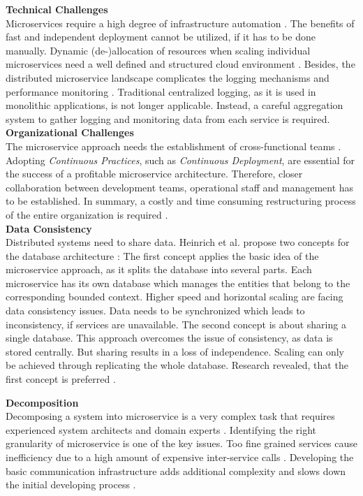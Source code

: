 \noindent
\textbf{Technical Challenges}\\
Microservices require a high degree of infrastructure automation \cite{MigratingTowardsSurvey}. The benefits of fast and independent deployment cannot be utilized, if it has to be done manually. Dynamic (de-)allocation of resources when scaling individual microservices need a well defined and structured cloud environment \cite{MigratingCloud}. 
Besides, the distributed microservice landscape complicates the logging mechanisms and performance monitoring \cite{SystematicMappingStudyMicroservice}. Traditional centralized logging, as it is used in monolithic applications, is not longer applicable. Instead, a careful aggregation system to gather logging and monitoring data from each service is required.\\

\noindent
\textbf{Organizational Challenges}\\
The microservice approach needs the establishment of cross-functional teams \cite{Fowler}. Adopting \textit{Continuous Practices}, such as \textit{Continuous Deployment}, are essential for the success of a profitable microservice architecture. Therefore, closer collaboration between development teams, operational staff and management has to be established. In summary, a costly and time consuming restructuring process of the entire organization is required \cite{NikoProseminar}. \\


\noindent
\textbf{Data Consistency}\\
Distributed systems need to share data. Heinrich et al. propose two concepts for the database architecture \cite{FunctionalDecompositionHeinrich}: The first concept applies the basic idea of the microservice approach, as it splits the database into several parts. Each microservice has its own database which manages the entities that belong to the corresponding bounded context. Higher speed and horizontal scaling are facing data consistency issues. Data needs to be synchronized which leads to inconsistency, if services are unavailable. The second concept is about sharing a single database. This approach overcomes the issue of consistency, as data is stored centrally. But sharing results in a loss of independence. Scaling can only be achieved through replicating the whole database. Research revealed, that the first concept is preferred \cite{FunctionalDecompositionHeinrich}. 



\noindent
\textbf{Decomposition}\\
Decomposing a system into microservice is a very complex task that requires experienced system architects and domain experts \cite{Fowler}. Identifying the right granularity of microservice is one of the key issues. Too fine grained services cause inefficiency due to a high amount of expensive inter-service calls \cite{DomainEngineeringMunezero}. Developing the basic communication infrastructure adds additional complexity and slows down the initial developing process \cite{infoq}. 





